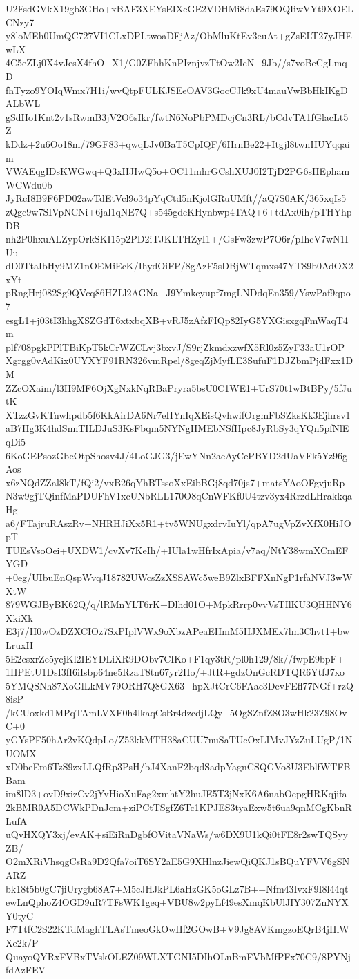 U2FsdGVkX19gb3GHo+xBAF3XEYsEIXeGE2VDHMi8daEs79OQIiwVYt9XOELCNzy7
y8loMEh0UmQC727VI1CLxDPLtwoaDFjAz/ObMluKtEv3euAt+gZsELT27yJHEwLX
4C5eZLj0X4vJesX4fhO+X1/G0ZFhhKnPIznjvzTtOw2IcN+9Jb//s7voBeCgLmqD
fhTyzo9YOIqWmx7H1i/wvQtpFULKJSEeOAV3GocCJk9xU4mauVwBbHkIKgDALbWL
gSdHo1Knt2v1sRwmB3jV2O6sIkr/fwtN6NoPbPMDcjCn3RL/bCdvTA1fGlacLt5Z
kDdz+2u6Oo18m/79GF83+qwqLJv0BaT5CpIQF/6HrnBe22+Itgjl8twnHUYqqaim
VWAEqgIDsKWGwq+Q3xHJIwQ5o+OC11mhrGCshXUJ0I2TjD2PG6sHEphamWCWdu0b
JyRcI8B9F6PD02awTdEtVcl9o34pYqCtd5nKjolGRuUMft//aQ7S0AK/365xqIs5
zQgc9w7SIVpNCNi+6jal1qNE7Q+s545gdeKHynbwp4TAQ+6+tdAx0ih/pTHYhpDB
nh2P0hxuALZypOrkSKI15p2PD2iTJKLTHZyI1+/GsFw3zwP7O6r/pIhcV7wN1IUu
dD0TtaIbHy9MZ1nOEMiEcK/IhydOiFP/8gAzF5sDBjWTqmxs47YT89b0AdOX2xYt
pRngHrj082Sg9QVcq86HZLl2AGNa+J9Ymkcyupf7mgLNDdqEn359/YswPaf9qpo7
esgL1+j03tI3hhgXSZGdT6xtxbqXB+vRJ5zAfzFIQp82IyG5YXGisxgqFmWaqT4m
plf708pgkPPlTBiKpT5kCrWZCLvj3bxvJ/S9rjZkmdxzwfX5Rl0z5ZyF33aU1rOP
Xgrgg0vAdKix0UYXYF91RN326vmRpel/8geqZjMyfLE3SufuF1DJZbmPjdFxx1DM
ZZcOXaim/l3H9MF6OjXgNxkNqRBaPryra5bsU0C1WE1+UrS70t1wBtBPy/5fJutK
XTzzGvKTnwhpdb5f6KkAirDA6Nr7eHYnIqXEisQvhwifOrgmFbSZksKk3Ejhrsv1
aB7Hg3K4hdSnnTILDJuS3KsFbqm5NYNgHMEbNSfHpc8JyRbSy3qYQn5pfNlEqDi5
6KoGEPsozGbeOtpShosv4J/4LoGJG3/jEwYNn2aeAyCePBYD2dUaVFk5Yz96gAos
x6zNQdZZal8kT/fQi2/vxB26qYhBTssoXxEibBGj8qd70js7+matsYAoOFgvjuRp
N3w9gjTQinfMaPDUFhV1xcUNbRLL170O8qCnWFKf0U4tzv3yx4RrzdLHrakkqaHg
a6/FTajruRAszRv+NHRHJiXx5R1+tv5WNUgxdrvIuYl/qpA7ugVpZvXfX0HiJOpT
TUEsVsoOei+UXDW1/cvXv7KeIh/+IUla1wHfrIxApia/v7aq/NtY38wmXCmEFYGD
+0eg/UIbuEnQspWvqJ18782UWcsZzXSSAWc5weB9ZlxBFFXnNgP1rfaNVJ3wWXtW
879WGJByBK62Q/q/lRMnYLT6rK+Dlhd01O+MpkRrrp0vvVsTIlKU3QHHNY6XkiXk
E3j7/H0wOzDZXCIOz7SxPIplVWx9oXbzAPeaEHmM5HJXMEx7lm3Chvt1+bwLruxH
5E2csxrZe5ycjKl2IEYDLiXR9DObv7CIKo+F1qy3tR/pl0h129/8k//fwpE9bpF+
1HPEtU1DsI3fI6iIsbp64ne5RzaT8tn67yr2Ho/+JtR+gdzOnGcRDTQR6YtfJ7xo
5YMQSNh87XoGlLkMV79ORH7Q8GX63+hpXJtCrC6FAac3DevFEfl77NGf+rzQ8isP
/kCUoxkd1MPqTAmLVXF0h4lkaqCsBr4dzcdjLQy+5OgSZnfZ8O3wHk23Z98OvC+0
yGYsPF50hAr2vKQdpLo/Z53kkMTH38aCUU7nuSaTUcOxLIMvJYzZuLUgP/1NUOMX
xD0beEm6TzS9zxLLQfRp3PsH/bJ4XanF2bqdSadpYagnCSQGVo8U3EblfWTFBBam
im8lD3+ovD9xizCv2jYvHioXuFag2xmhtY2huJE5T3jNxK6A6nabOepgHRKqjifa
2kBMR0A5DCWkPDnJcm+ziPCtTSgfZ6Tc1KPJES3tyaExw5t6ua9qnMCgKbnRLufA
uQvHXQY3xj/evAK+siEiRnDgbfOVitaVNaWs/w6DX9U1kQi0tFE8r2swTQSyyZB/
O2mXRiVhsqgCsRa9D2Qfa7oiT6SY2aE5G9XHlnzJiewQiQKJ1sBQuYFVV6gSNARZ
bk18t5b0gC7jiUrygb68A7+M5cJHJkPL6aHzGK5oGLz7B++Nfm43IvxF9I8l44qt
ewLnQphoZ4OGD9uR7TFsWK1geq+VBU8w2pyLf49esXmqKbUlJIY307ZnNYXY0tyC
F7TtfC2S22KTdMaghTLAsTmeoGkOwHf2GOwB+V9Jg8AVKmgzoEQrB4jHlWXe2k/P
QuayoQYRxFVBxTVskOLEZ09WLXTGNI5DIhOLnBmFVbMfPFx70C9/8PYNjfdAzFEV
